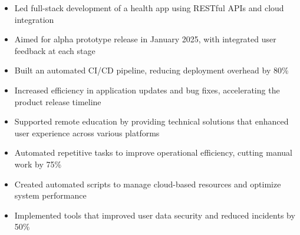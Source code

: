 \par\smallskip
\noindent
\begin{minipage}{20cm}
  \begin{minipage}{9.75cm}
    \begin{itemize}
      \item Led full-stack development of a health app using RESTful APIs and cloud integration
      \item Aimed for alpha prototype release in January 2025, with integrated user feedback at each stage
    \end{itemize}
  \end{minipage}
  \hfill
  \begin{minipage}{9.75cm}
    \begin{itemize}
      \item Built an automated CI/CD pipeline, reducing deployment overhead by 80\%
      \item Increased efficiency in application updates and bug fixes, accelerating the product release timeline
    \end{itemize}
  \end{minipage}
\end{minipage}
\par\smallskip
\divider

\par\smallskip
\noindent
\begin{minipage}{20cm}
  \begin{minipage}{9.75cm}
    \begin{itemize}
      \item Supported remote education by providing technical solutions that enhanced user experience across various platforms
      \item Automated repetitive tasks to improve operational efficiency, cutting manual work by 75\%
    \end{itemize}
  \end{minipage}
  \hfill
  \begin{minipage}{9.75cm}
    \begin{itemize}
      \item Created automated scripts to manage cloud-based resources and optimize system performance
      \item Implemented tools that improved user data security and reduced incidents by 50\%
    \end{itemize}
  \end{minipage}
\end{minipage}

